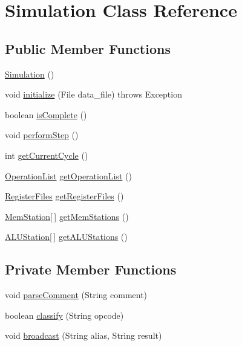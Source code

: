 \hypertarget{classSimulation}{\section{\-Simulation \-Class \-Reference}
\label{classSimulation}
}
\subsection*{\-Public \-Member \-Functions}
\begin{DoxyCompactItemize}
\item 
\hyperlink{classSimulation_aa24c4314fd1e140a1b9ad5feb06c6fb0}{\-Simulation} ()
\item 
void \hyperlink{classSimulation_a104eb3d562c22b1b10511adff57f4b4d}{initialize} (\-File data\-\_\-file)  throws Exception
\item 
boolean \hyperlink{classSimulation_ac47aeddaac1229f921bd8644aff688a9}{is\-Complete} ()
\item 
void \hyperlink{classSimulation_a6aa2ea799b5276681e8eb7c941c29d98}{perform\-Step} ()
\item 
int \hyperlink{classSimulation_a0cc18516e5b9e6f05b657d65adbb9f7b}{get\-Current\-Cycle} ()
\item 
\hyperlink{classOperationList}{\-Operation\-List} \hyperlink{classSimulation_a1cff8890330ebfd903d0e7bbef784a45}{get\-Operation\-List} ()
\item 
\hyperlink{classRegisterFiles}{\-Register\-Files} \hyperlink{classSimulation_affe7128840546c078763f7e21c3dac47}{get\-Register\-Files} ()
\item 
\hyperlink{classMemStation}{\-Mem\-Station}\mbox{[}$\,$\mbox{]} \hyperlink{classSimulation_a2f73acac6cc327ccd7721a797b8bdf6c}{get\-Mem\-Stations} ()
\item 
\hyperlink{classALUStation}{\-A\-L\-U\-Station}\mbox{[}$\,$\mbox{]} \hyperlink{classSimulation_a717866287d7c9ad508105400cd58a704}{get\-A\-L\-U\-Stations} ()
\end{DoxyCompactItemize}
\subsection*{\-Private \-Member \-Functions}
\begin{DoxyCompactItemize}
\item 
void \hyperlink{classSimulation_a24ef9f4425a72b53e78d79f2496f00a2}{parse\-Comment} (\-String comment)
\item 
boolean \hyperlink{classSimulation_a50ecd57c05305f3a27255b25d5c29188}{classify} (\-String opcode)
\item 
void \hyperlink{classSimulation_acb55c33781847629f2523d0aa58e6f71}{broadcast} (\-String alias, \-String result)
\end{DoxyCompactItemize}
